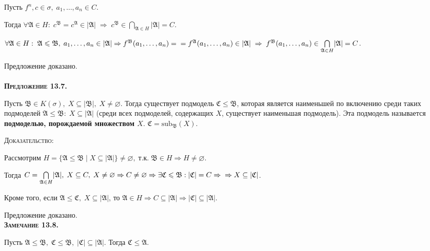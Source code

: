 \documentclass[18pt, a4paper]{extarticle}
\begin{document}
Пусть $f^n, c\in\sigma,\;a_1,\dots,a_n\in C$. 

Тогда $\forall\mathfrak{A}\in H:\; c^{\mathfrak{B}}=c^{\mathfrak{A}}\in|\mathfrak{A}|\;\Rightarrow\;c^{\mathfrak{B}}\in\underset{\mathfrak{A}\in H}{\bigcap}|\mathfrak{A}|=C$.

$\forall\mathfrak{A}\in H:\;\mathfrak{A}\leqslant\mathfrak{B},\;a_1,\dots,a_n\in|\mathfrak{A}|\Rightarrow f^{\mathfrak{B}}(a_1,\dots,a_n)=\\=f^{\mathfrak{A}}(a_1,\dots,a_n)\in|\mathfrak{A}|\;\Rightarrow\;f^{\mathfrak{B}}(a_1,\dots,a_n)\in\underset{\mathfrak{A}\in H}{\bigcap}|\mathfrak{A}|=C$.

Предложение доказано.\\\\

\textbf{\textsc{Предложение 13.7.}} 

Пусть $\mathfrak{B}\in K(\sigma),\;X\subseteq|\mathfrak{B}|,\;X\neq\varnothing$. Тогда существует подмодель $\mathfrak{C}\leqslant\mathfrak{B}$, которая является наименьшей по включению среди таких подмоделей $\mathfrak{A}\leqslant\mathfrak{B}:\;X\subseteq|\mathfrak{A}|$ (среди всех подмоделей, содержащих $X$, существует наименьшая подмодель). Эта подмодель называется \textbf{подмоделью, порождаемой множеством $X$}.  $\mathfrak{C}=\text{sub}_{\mathfrak{B}}(X)$.

\textsc{Доказательство:}

Рассмотрим $H=\{\mathfrak{A}\leqslant\mathfrak{B}\;|\;X\subseteq|\mathfrak{A}|\}\neq\varnothing,\;$т.к$.\;\mathfrak{B}\in H\Rightarrow H\neq\varnothing$.

Тогда $C=\underset{\mathfrak{A}\in H}{\bigcap}|\mathfrak{A}|,\;X\subseteq C,\;X\neq\varnothing\Rightarrow C\neq\varnothing\Rightarrow\exists\mathfrak{C}\leqslant\mathfrak{B}:|\mathfrak{C}|=C\Rightarrow\\\Rightarrow X\subseteq|\mathfrak{C}|$. 

Кроме того, если $\mathfrak{A}\leqslant\mathfrak{C},\; X\subseteq|\mathfrak{A}|$, то $\mathfrak{A}\in H\Rightarrow C\subseteq|\mathfrak{A}|\Rightarrow|\mathfrak{C}|\subseteq|\mathfrak{A}|$.

Предложение доказано.\\

\textbf{\textsc{Замечание 13.8.}} 

Пусть  $\mathfrak{A}\leqslant\mathfrak{B},\;\mathfrak{C}\leqslant\mathfrak{B},\;|\mathfrak{C}|\subseteq|\mathfrak{A}|$. Тогда $\mathfrak{C}\leqslant\mathfrak{A}$.
\end{document}
